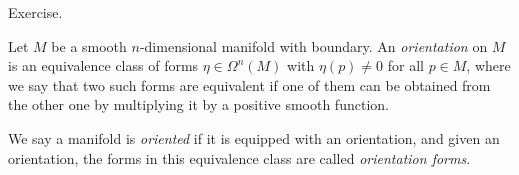 \documentclass{ximera}
\begin{document}
\begin{solution}
Exercise. 

\end{solution}




\begin{definition}[Orientation]
    Let $M$ be a smooth $n$-dimensional manifold with boundary. An \emph{orientation} on $M$ is an equivalence class of forms $\eta \in \Omega ^n (M) $ with $\eta (p) \neq 0$ for all $p \in M$, where we say that two such forms are equivalent if one of them can be obtained from the other one by multiplying it by a positive smooth function. 
    
    
    We say a manifold is \emph{oriented} if it is equipped with an orientation, and given an orientation, the forms in this equivalence class are called \emph{orientation forms}.  
\end{definition}

 
\end{document}
